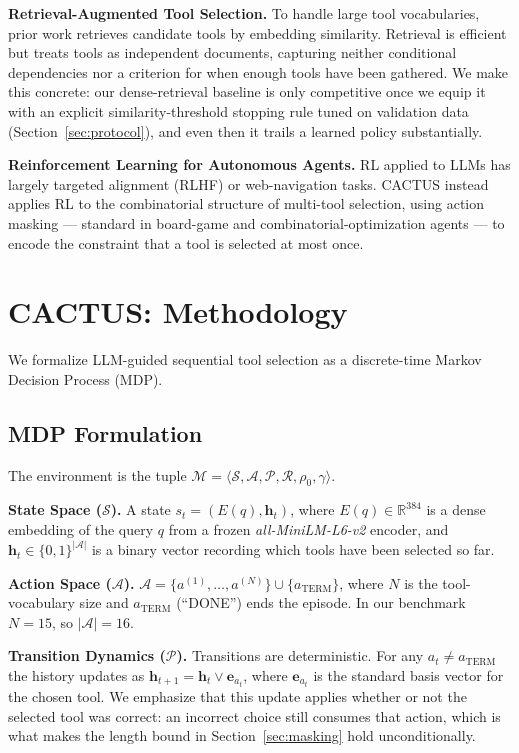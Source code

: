 \documentclass[11pt]{article}
\begin{document}
\textbf{Retrieval-Augmented Tool Selection.} To handle large tool vocabularies, prior work retrieves candidate tools by embedding similarity. Retrieval is efficient but treats tools as independent documents, capturing neither conditional dependencies nor a criterion for when enough tools have been gathered. We make this concrete: our dense-retrieval baseline is only competitive once we equip it with an explicit similarity-threshold stopping rule tuned on validation data (Section~\ref{sec:protocol}), and even then it trails a learned policy substantially.

\textbf{Reinforcement Learning for Autonomous Agents.} RL applied to LLMs has largely targeted alignment (RLHF) or web-navigation tasks. CACTUS instead applies RL to the combinatorial structure of multi-tool selection, using action masking --- standard in board-game and combinatorial-optimization agents --- to encode the constraint that a tool is selected at most once.

\section{CACTUS: Methodology}
We formalize LLM-guided sequential tool selection as a discrete-time Markov Decision Process (MDP).

\subsection{MDP Formulation}
The environment is the tuple $\mathcal{M} = \langle \mathcal{S}, \mathcal{A}, \mathcal{P}, \mathcal{R}, \rho_0, \gamma \rangle$.

\textbf{State Space ($\mathcal{S}$).}
A state $s_t = (E(q), \mathbf{h}_t)$, where $E(q) \in \mathbb{R}^{384}$ is a dense embedding of the query $q$ from a frozen \textit{all-MiniLM-L6-v2} encoder, and $\mathbf{h}_t \in \{0,1\}^{|\mathcal{A}|}$ is a binary vector recording which tools have been selected so far.

\textbf{Action Space ($\mathcal{A}$).}
$\mathcal{A} = \{a^{(1)}, \dots, a^{(N)}\} \cup \{a_{\text{TERM}}\}$, where $N$ is the tool-vocabulary size and $a_{\text{TERM}}$ (``DONE'') ends the episode. In our benchmark $N = 15$, so $|\mathcal{A}| = 16$.

\textbf{Transition Dynamics ($\mathcal{P}$).}
Transitions are deterministic. For any $a_t \neq a_{\text{TERM}}$ the history updates as $\mathbf{h}_{t+1} = \mathbf{h}_t \vee \mathbf{e}_{a_t}$, where $\mathbf{e}_{a_t}$ is the standard basis vector for the chosen tool. We emphasize that this update applies whether or not the selected tool was correct: an incorrect choice still consumes that action, which is what makes the length bound in Section~\ref{sec:masking} hold unconditionally.
\end{document}
